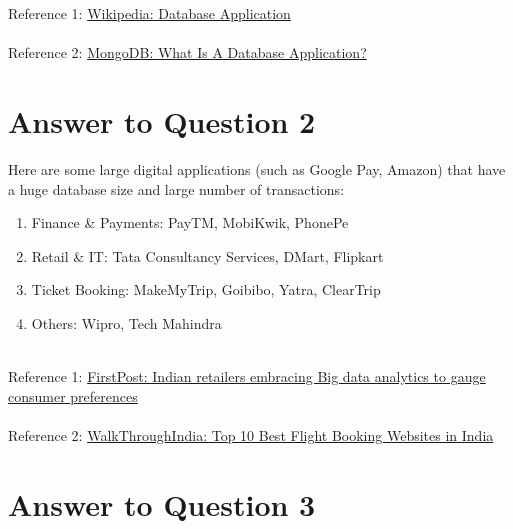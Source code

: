 \documentclass{article}
\begin{document}
\\ \\
Reference 1:
{\color{blue}
\href{https://en.wikipedia.org/wiki/Database_application}
{Wikipedia: Database Application}
}
\\ \\ 
Reference 2:
{\color{blue}
\href{https://www.mongodb.com/basics/database-application}
{MongoDB: What Is A Database Application?}
}

\section{Answer to Question 2}
Here are some large digital applications (such as Google Pay, Amazon) that have a huge database size and large number of transactions:
\begin{enumerate}
    \item Finance \& Payments: PayTM, MobiKwik, PhonePe
    \item Retail \& IT: Tata Consultancy Services, DMart, Flipkart
    \item Ticket Booking: MakeMyTrip, Goibibo, Yatra, ClearTrip
    \item Others: Wipro, Tech Mahindra
\end{enumerate}
\\
Reference 1:
{\color{blue}
\href{https://www.firstpost.com/business/indian-retailers-embracing-big-data-analytics-gauge-consumer-preferences-2353926.html}
{FirstPost: Indian retailers embracing Big data analytics to gauge consumer preferences}
}
\\ \\ 
Reference 2:
{\color{blue}
\href{http://www.walkthroughindia.com/offbeat/top-10-best-flight-booking-websites-in-india/}
{WalkThroughIndia: Top 10 Best Flight Booking Websites in India}
}

\section{Answer to Question 3}
\end{document}
